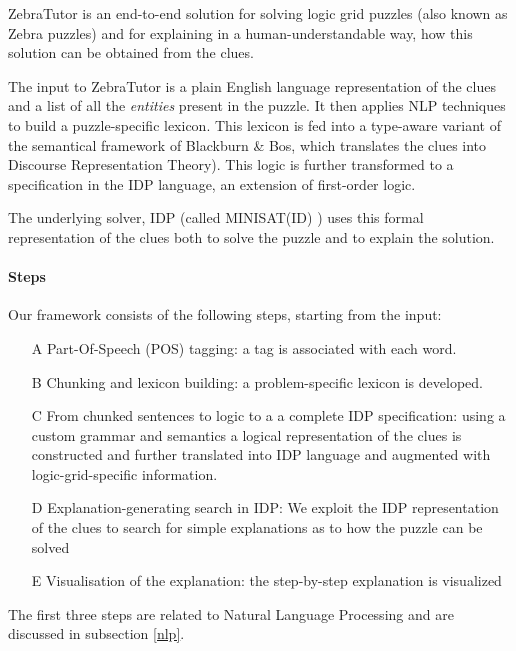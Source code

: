 ZebraTutor is an end-to-end solution for solving logic grid puzzles (also known as Zebra puzzles) and for explaining in a human-understandable way, how this solution can be obtained from the clues. 

The input to ZebraTutor is a plain English language representation of the clues and a list of all the \textit{entities} present in the puzzle. It then applies NLP techniques to build a puzzle-specific lexicon. This lexicon is fed into a type-aware variant of the semantical framework of Blackburn \& Bos, which translates the clues into Discourse Representation Theory). This logic is further transformed to a specification in the IDP language, an extension of first-order logic. 

The underlying solver, IDP\cite{de2018predicate} (called
 MINISAT(ID) ) uses this formal representation of the clues both to  solve the puzzle and to explain the solution. 
 
\paragraph{Steps} Our framework consists of the following steps, starting from the input:
\begin{enumerate}
	\item[A] \label{steps_A} Part-Of-Speech (POS) tagging: a tag is associated with each word.\\
	\item[B] \label{steps_B} Chunking and lexicon building: a problem-specific lexicon is developed. \\
	\item[C] \label{steps_C} From chunked sentences to logic to a a complete IDP specification: using a custom grammar and semantics a logical representation of the clues is constructed and further translated into IDP language and augmented with logic-grid-specific information.\\
	\item[D] \label{steps_D} Explanation-generating search in IDP: We exploit the IDP representation of the clues to search for simple explanations as to how the puzzle can be solved\\
	\item[E] \label{steps_E} Visualisation of the explanation: the step-by-step explanation is visualized

\end{enumerate}
The first three steps are related to Natural Language Processing and are discussed in subsection \ref{nlp}.%

